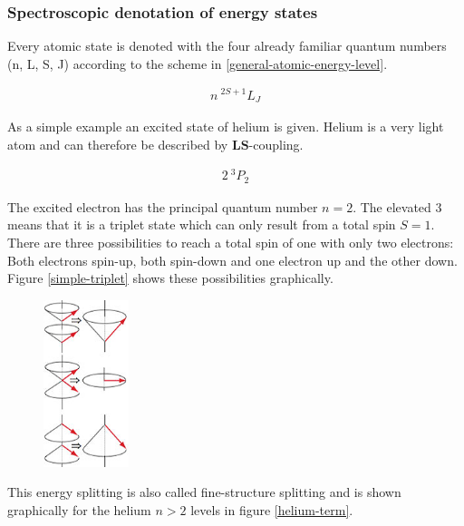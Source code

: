 \documentclass[parskip,12pt,headsepline,a4paper] {scrbook}
\begin{document}
\subsubsection{Spectroscopic denotation of energy states}
\vspace{-1\baselineskip}
Every atomic state is denoted with the four already familiar quantum numbers (n, L, S, J) according to the scheme in \ref{general-atomic-energy-level}.

\begin{align}  \label{general-atomic-energy-level}
n ~ ^{2S+1}L_J
\end{align}

As a simple example an excited state of helium is given. Helium is a very light atom and can therefore be described by $\mathbf{LS}$-coupling.

\begin{align}  \label{atomic-energy-level}
2 ~ ^3P_2
\end{align}

The excited electron has the principal quantum number $n = 2$. The elevated 3 means that it is a triplet state which can only result from a total spin $S = 1$. There are three possibilities to reach a total spin of one with only two electrons: Both electrons spin-up, both spin-down and one electron up and the other down. Figure \ref{simple-triplet} shows these possibilities graphically.

\begin{figure}[ht]
\centerline{
\includegraphics[width=2.5cm]{./spectroscopy/simple-triplet_sharp.jpg}}
\end{figure}

This energy splitting is also called fine-structure splitting and is shown graphically for the helium $n > 2$ levels in figure \ref{helium-term}.
\end{document}
